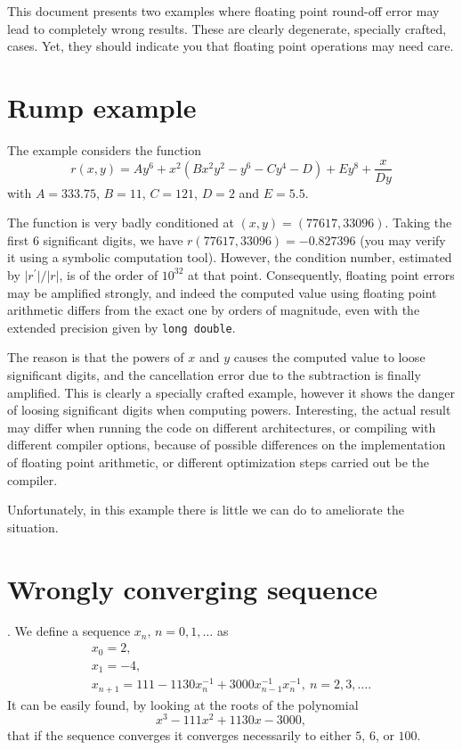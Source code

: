 \documentclass{article}
\begin{document}
This document presents two examples where floating point round-off error may lead to completely wrong results. These are clearly degenerate, specially crafted,  cases. Yet, they should indicate you that floating point operations may need care.

\section{Rump example}
The example considers the function
\[
  r(x,y)=Ay^6+x^2(Bx^2y^2-y^6-Cy^4-D)+Ey^8+\frac{x}{Dy}
\]
 with
  $A=333.75$, $B=11$, $C=121$, $D=2$ and $E=5.5$.
  
  The function is very badly conditioned at $(x,y)=(77617,33096)$.
  Taking the first $6$ significant digits, we have
  $r(77617,33096)=-0.827396$ (you may verify it using a symbolic
  computation tool). However, the condition number, estimated by
  $\vert r^\prime\vert/\vert r\vert$, is of the order of $10^{32}$ at
  that point. Consequently, floating point errors may be amplified
  strongly, and indeed the computed value using floating point
  arithmetic differs from the exact one by orders of magnitude, even
  with the extended precision given by \texttt{long double}.

  The reason is that the powers of $x$ and $y$ causes the computed
  value to loose significant digits, and the cancellation error due to
  the subtraction is finally amplified. This is clearly a specially
  crafted example, however it shows the danger of loosing significant
  digits when computing powers. Interesting, the actual result may
  differ when running the code on different architectures, or
  compiling with different compiler options, because of possible differences
  on the implementation of floating point arithmetic, or different
  optimization steps carried out be the compiler.

  Unfortunately, in this example there is little we can do to
  ameliorate the situation. 
  
\section{Wrongly converging sequence}.
We define a sequence $x_n,\, n=0,1,\ldots$ as
\[
  \begin{array}{l}
    x_0=2,\\
    x_1=-4,\\
    x_{n+1}=111-1130x_n^{-1}+3000x^{-1}_{n-1}x^{-1}_{n},\ n=2,3,\ldots.
  \end{array}
\]
    It can be easily found, by looking at the roots of the polynomial
    \[
    x^3-111x^2+1130x-3000,
    \]
    that if the sequence converges it converges necessarily to either
    $5$, $6$, or $100$.
    
\end{document}
